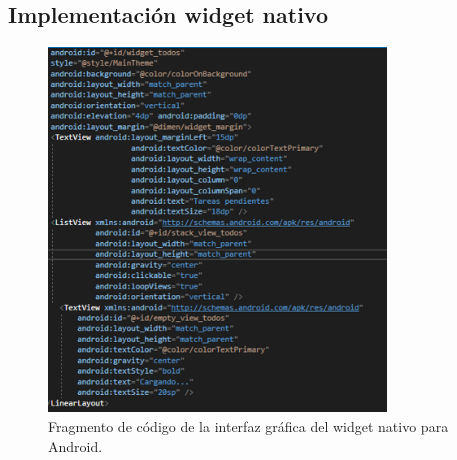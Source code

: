 \documentclass[10pt]{article}
\begin{document}
\subsection{Implementación widget nativo}
\begin{figure}[H]
    \begin{center}
    \includegraphics[width=0.8\textwidth]{Imagenes/widget.png}
    \caption{Fragmento de código de la interfaz gráfica del widget nativo para Android.}
\label{fig1}
    \end{center}
\end{figure} 
\end{document}
